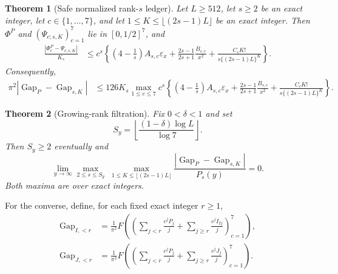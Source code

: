 \documentclass[11pt]{article}
\newtheorem{theorem}{Theorem}[section]
\theoremstyle{definition}
\theoremstyle{remark}
\newcommand{\eps}{\varepsilon}
\newcommand{\PhiP}{\Phi^{P}}
\newcommand{\GapP}{\operatorname{Gap}_{P}}
\newcommand{\GapSK}{\operatorname{Gap}_{s,K}}
\newcommand{\GapIr}{\operatorname{Gap}_{I,<r}}
\newcommand{\GapJr}{\operatorname{Gap}_{J,<r}}
\begin{document}
\begin{theorem}[Safe normalized rank-$s$ ledger]
\label{thm:finite-master}
Let $L\ge512$, let $s\ge2$ be an exact integer, let
$c\in\{1,\ldots,7\}$, and let
$1\le K\le\lfloor(2s-1)L\rfloor$ be an exact integer.  Then
$\PhiP$ and $(\Psi_{c;s,K})_{c=1}^7$ lie in $[0,1/2]^7$, and
\begin{align}
 \frac{|\PhiP_c-\Psi_{c;s,K}|}{K_s}
 &\le c^s\left\{
 \left(4-\frac1s\right)A_{s,c}\eps_x
 +\frac{2s-1}{2s+1}\frac{B_{s,c}}{x^2}
 +\frac{C_cK!}{s\{(2s-1)L\}^K}
 \right\}.
 \label{eq:normalized-master}
\end{align}
Consequently,
\begin{align}
 \pi^2|\GapP-\GapSK|
 &\le126K_s\max_{1\le c\le7}c^s\left\{
 \left(4-\frac1s\right)A_{s,c}\eps_x
 +\frac{2s-1}{2s+1}\frac{B_{s,c}}{x^2}
 +\frac{C_cK!}{s\{(2s-1)L\}^K}
 \right\}.
 \label{eq:endpoint-master}
\end{align}
\end{theorem}

\begin{theorem}[Growing-rank filtration]
\label{thm:growing}
Fix $0<\delta<1$ and set
\begin{equation}
 S_y=\left\lfloor\frac{(1-\delta)\log L}{\log7}\right\rfloor.
 \label{eq:Sy}
\end{equation}
Then $S_y\ge2$ eventually and
\begin{equation}
 \boxed{\lim_{y\to\infty}
 \max_{2\le s\le S_y}\;
 \max_{1\le K\le\lfloor(2s-1)L\rfloor}
 \frac{|\GapP-\GapSK|}{P_s(y)}=0.}
 \label{eq:growing-conclusion}
\end{equation}
Both maxima are over exact integers.
\end{theorem}

For the converse, define, for each fixed exact integer $r\ge1$,
\begin{align}
 \GapIr&=\frac1{\pi^2}F\left(
 \left(\sum_{j<r}\frac{c^jP_j}{j}
 +\sum_{j\ge r}\frac{c^jI_{2j}}j\right)_{c=1}^7\right),
 \label{eq:GapI-def}\\
 \GapJr&=\frac1{\pi^2}F\left(
 \left(\sum_{j<r}\frac{c^jP_j}{j}
 +\sum_{j\ge r}\frac{c^jJ_j}j\right)_{c=1}^7\right).
 \label{eq:GapJ-def}
\end{align}
\end{document}
